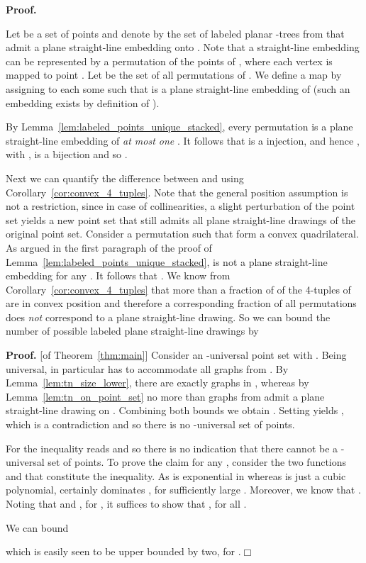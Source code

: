 \documentclass[11pt]{article}
\newcommand{\qed}{\hfill\ensuremath{\Box}}
\newenvironment{proof}{\noindent\textbf{Proof.}
}{\par\medskip}
\begin{document}
\begin{proof}
  Let  be a set of  points and denote by
   the set of labeled planar -trees from 
  that admit a plane straight-line embedding onto . Note that a
  straight-line embedding can be represented by a permutation  of
  the points of , where each vertex  is mapped to point
  . Let  be the set of all permutations of . We define
  a map  by assigning to each  some
   such that  is a plane straight-line
  embedding of  (such an embedding exists by definition of ).

  By Lemma~\ref{lem:labeled_points_unique_stacked}, every permutation
   is a plane straight-line embedding of \emph{at most
    one} . It follows that  is a injection, and hence
  , with , is a bijection and so  
  .

  Next we can quantify the difference between  and  using
  Corollary~\ref{cor:convex_4_tuples}. Note that the general position
  assumption is not a restriction, since in case of collinearities, a
  slight perturbation of the point set yields a new point set that
  still admits all plane straight-line drawings of the original point
  set. Consider a permutation  such that
   form a convex quadrilateral. As argued in the
  first paragraph of the proof of
  Lemma~\ref{lem:labeled_points_unique_stacked},  is not a plane
  straight-line embedding for any . It follows that . We know from Corollary~\ref{cor:convex_4_tuples}
  that more than a fraction of  of the 4-tuples of
   are in convex position and therefore a corresponding fraction of
  all permutations does \emph{not} correspond to a plane straight-line
  drawing. So we can bound the number of possible labeled plane
  straight-line drawings by
  
\end{proof}

\begin{proof}[of Theorem~\ref{thm:main}]
  Consider an -universal point set  with
  . Being universal, in particular  has to accommodate all
  graphs from . By Lemma~\ref{lem:tn_size_lower}, there are
  exactly  graphs in , whereas by
  Lemma~\ref{lem:tn_on_point_set} no more than
   graphs from  admit a plane
  straight-line drawing on . Combining both bounds we obtain
  . Setting  yields
  , which is a
  contradiction and so there is no -universal set of  points.

  For  the inequality reads  and so there is no indication that there cannot be a
  -universal set of  points. To prove the claim for any
  , consider the two functions  and
   that constitute the inequality. As  is
  exponential in  whereas  is just a cubic polynomial, 
  certainly dominates , for sufficiently large .  Moreover, we
  know that . Noting that  and ,
  for , it suffices to show that , for all .  

  \noindent We can bound
  
  which is easily seen to be upper bounded by two, for .\qed
\end{proof}
\end{document}

